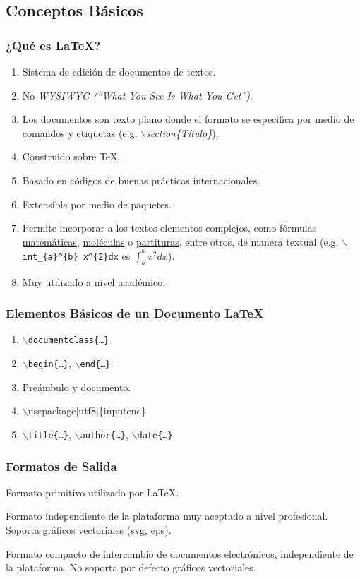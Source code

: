 \documentclass[a4paper,slidestop,xcolor=pst,dvips,blue]{beamer}
\newcommand{\command}[1]{\texttt{$\backslash$#1\{\dots\}}}
\begin{document}
\subsection{Conceptos Básicos}

\begin{frame}[c]
    \frametitle{¿Qué es \LaTeX?}
    \begin{enumerate}[<+->]
        \item Sistema de edición de documentos de textos.
        \item No \emph{WYSIWYG (``What You See Is What You Get'')}.
        \item Los documentos son texto plano donde el formato se especifica por medio de comandos y etiquetas (e.g. \emph{$\backslash$section\{Título\}}).
        \item Construido sobre \TeX.
        \item Basado en códigos de buenas prácticas internacionales.
        \item Extensible por medio de paquetes.
        \item Permite incorporar a los textos elementos complejos, como fórmulas \href{https://es.overleaf.com/learn/latex/Mathematical_expressions}{matemáticas}, \href{https://osl.ugr.es/CTAN/macros/generic/chemfig/chemfig-en.pdf}{moléculas} o
            \href{http://tug.ctan.org/info/latex4musicians/latex4musicians.pdf}{partituras}, entre otros, de manera textual (e.g. \texttt{$\backslash$int\_\{a\}\^{}\{b\} x\^{}\{2\}dx} es $\int_{a}^{b} x^{2} dx$).
        \item Muy utilizado a nivel académico.
    \end{enumerate}
\end{frame}

\begin{frame}[c]
    \frametitle{Elementos Básicos de un Documento \LaTeX}
    \begin{enumerate}[<+->]
        \item \command{documentclass}
        \item \command{begin}, \command{end}
        \item Preámbulo y documento.
        \item $\backslash$usepackage[utf8]\{inputenc\}
        \item \command{title}, \command{author}, \command{date}
    \end{enumerate}
\end{frame}

\begin{frame}[c]
    \frametitle{Formatos de Salida}
    \begin{description}[<+->]
        \item[DVI] Formato primitivo utilizado por \LaTeX.
        \item[Postscript] Formato independiente de la plataforma muy aceptado a nivel profesional. Soporta gráficos vectoriales (svg, eps).
        \item[PDF] Formato compacto de intercambio de documentos electrónicos, independiente de la plataforma. No soporta por defecto gráficos vectoriales.
    \end{description}
\end{frame}
\end{document}
